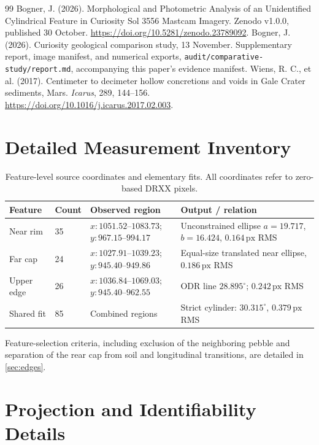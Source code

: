 \documentclass[11pt,letterpaper]{article}
\newcommand{\px}{\,\mathrm{px}}
\newcommand{\sourcepath}[1]{\nolinkurl{#1}}
\begin{document}
\begin{thebibliography}{99}
 Bogner, J. (2026). Morphological and Photometric Analysis of an Unidentified Cylindrical Feature in Curiosity Sol 3556 Mastcam Imagery. Zenodo v1.0.0, published 30 October. \url{https://doi.org/10.5281/zenodo.23789092}.
 Bogner, J. (2026). Curiosity geological comparison study, 13 November. Supplementary report, image manifest, and numerical exports, \sourcepath{audit/comparative-study/report.md}, accompanying this paper's evidence manifest.
 Wiens, R. C., et al. (2017). Centimeter to decimeter hollow concretions and voids in Gale Crater sediments, Mars. \emph{Icarus}, 289, 144--156. \url{https://doi.org/10.1016/j.icarus.2017.02.003}.
\end{thebibliography}

\appendix
\section{Detailed Measurement Inventory}
\label{app:inventory}

\begin{table}[ht]
\centering\small
\caption{Feature-level source coordinates and elementary fits. All coordinates refer to zero-based DRXX pixels.}
\begin{tabularx}{\linewidth}{@{}l l l X@{}}
\toprule
\textbf{Feature} & \textbf{Count} & \textbf{Observed region} & \textbf{Output / relation} \\
\midrule
Near rim & 35 & \(x:1051.52\)--\(1083.73\); \(y:967.15\)--\(994.17\) & Unconstrained ellipse \(a=19.717\), \(b=16.424\), \(0.164\px\) RMS \\
Far cap & 24 & \(x:1027.91\)--\(1039.23\); \(y:945.40\)--\(949.86\) & Equal-size translated near ellipse, \(0.186\px\) RMS \\
Upper edge & 26 & \(x:1036.84\)--\(1069.03\); \(y:945.40\)--\(962.55\) & ODR line \(28.895^\circ\); \(0.242\px\) RMS \\
Shared fit & 85 & Combined regions & Strict cylinder: \(30.315^\circ\), \(0.379\px\) RMS \\
\bottomrule
\end{tabularx}
\end{table}

Feature-selection criteria, including exclusion of the neighboring pebble and separation of the rear cap from soil and longitudinal transitions, are detailed in \cref{sec:edges}.

\section{Projection and Identifiability Details}
\label{app:projection}
\end{document}
